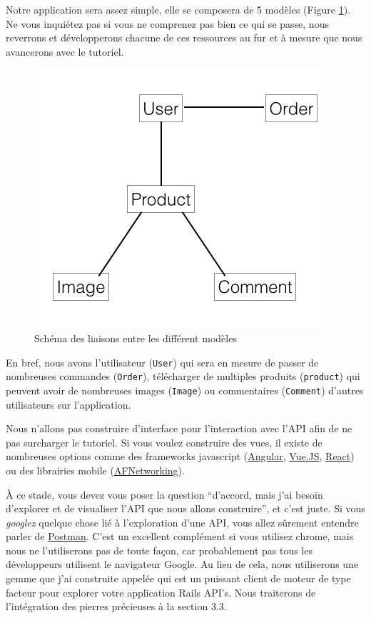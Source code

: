 \documentclass[]{report}
\begin{document}
    Notre application sera assez simple, elle se composera de 5 modèles (Figure \ref{fig:data_model}). Ne vous inquiétez pas si vous ne comprenez pas bien ce qui se passe, nous reverrons et développerons chacune de ces ressources au fur et à mesure que nous avancerons avec le tutoriel.

    \begin{figure}
      \includegraphics[width=\linewidth]{img/data_model.png}
      \caption{Schéma des liaisons entre les différent modèles}
      \label{fig:data_model}
    \end{figure}

    En bref, nous avons l'utilisateur (\verb|User|) qui sera en mesure de passer de nombreuses commandes (\verb|Order|), télécharger de multiples produits (\verb|product|) qui peuvent avoir de nombreuses images (\verb|Image|) ou commentaires (\verb|Comment|) d'autres utilisateurs sur l'application.

    Nous n'allons pas construire d'interface pour l'interaction avec l'API afin de ne pas surcharger le tutoriel.  Si vous voulez construire des vues, il existe de nombreuses options comme des frameworks javascript (\href{https://angularjs.org/}{Angular}, \href{https://vuejs.org/}{Vue.JS}, \href{https://reactjs.org/}{React}) ou des librairies mobile (\href{https://github.com/AFNetworking/AFNetworking}{AFNetworking}).

    À ce stade, vous devez vous poser la question \enquote{d'accord, mais j'ai besoin d'explorer et de visualiser l'API que nous allons construire}, et c'est juste. Si vous \textit{googlez} quelque chose lié à l'exploration d'une API, vous allez sûrement entendre parler de \href{https://www.getpostman.com/}{Postman}. C'est un excellent complément si vous utilisez chrome, mais nous ne l'utiliserons pas de toute façon, car probablement pas tous les développeurs utilisent le navigateur Google. Au lieu de cela, nous utiliserons une gemme que j'ai construite appelée  qui est un puissant client de moteur de type facteur pour explorer votre application Rails API's. Nous traiterons de l'intégration des pierres précieuses à la section 3.3.
\end{document}
